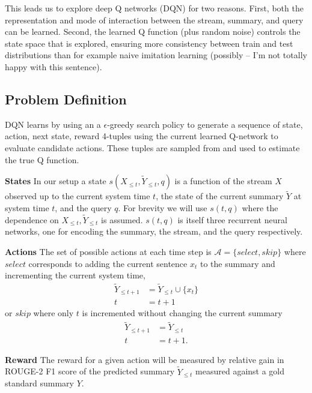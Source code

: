 \documentclass[12pt]{article}
\begin{document}
  This leads us to explore deep Q networks (DQN) for two reasons. 
  First, both the 
  representation and mode of interaction between the stream, summary, and 
  query can be learned. 
  Second, the learned Q function (plus random noise) controls the state 
  space that is explored, ensuring more consistency between train and test 
  distributions than for example naive imitation learning 
  (possibly -- I'm not totally happy with this sentence).

\subsection{Problem Definition}
   
    DQN learns by using an a $\epsilon$-greedy search policy to generate a 
    sequence of state, action, next state, reward 4-tuples using the current
    learned Q-network to evaluate candidate actions. These tuples are sampled
    from and used to estimate the true Q function.

    \textbf{States} 
    In our setup a state $s(X_{\le t},\tilde{Y}_{\le t}, q)$ is a function
    of the stream $X$ observed up to the current system time $t$, the state
    of the current summary $\tilde{Y}$ at system time $t$, and the query $q$.
    For brevity we will use $s(t,q)$ where the dependence on 
    $X_{\le t},\tilde{Y}_{\le t}$ is assumed.
    $s(t,q)$ is itself three recurrent neural networks, one for encoding 
    the summary, the stream, and the query respectively.

    \textbf{Actions} 
    The set of possible actions at each time step is 
    $\mathcal{A} = \{select, skip\}$ where $select$ corresponds to adding the 
    current sentence $x_t$ to the summary and incrementing the current system
    time, 
    \begin{align*}
        \tilde{Y}_{\le t + 1} &= \tilde{Y}_{\le t} \cup \{ x_t \} \\
        t &= t + 1    
    \end{align*}
    or $skip$ where only $t$ is incremented without changing the current 
    summary
    \begin{align*}
        \tilde{Y}_{\le t + 1} &= \tilde{Y}_{\le t}  \\
        t &= t + 1.
    \end{align*}


    \textbf{Reward} 
    The reward for a given action will be measured by relative gain in 
    ROUGE-2 F1 score of the predicted summary $\tilde{Y}_{\le t}$ measured
    against a gold standard summary $Y$.
\end{document}
